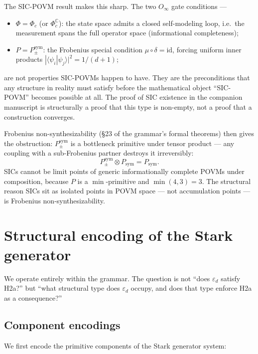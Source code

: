 \documentclass[12pt]{article}
\theoremstyle{plain}
\theoremstyle{definition}
\theoremstyle{remark}
\newcommand{\epsd}{\varepsilon_d}
\begin{document}
The SIC-POVM result makes this sharp. The two $O_\infty$ gate conditions —
\begin{itemize}
  \item $\Phi = \Phi_c$ (or $\Phi_c^\mathbb{C}$): the state space admits a closed self-modeling
    loop, i.e.\ the measurement spans the full operator space (informational completeness);
  \item $P = P_{\pm}^{\text{sym}}$: the Frobenius special condition $\mu \circ \delta =
    \mathrm{id}$, forcing uniform inner products
    $|\langle \psi_i | \psi_j \rangle|^2 = 1/(d+1)$;
\end{itemize}
are not properties SIC-POVMs happen to have. They are the preconditions that any structure in
reality must satisfy before the mathematical object ``SIC-POVM'' becomes possible at all. The
proof of SIC existence in the companion manuscript is structurally a proof that this type is
non-empty, not a proof that a construction converges.

Frobenius non-synthesizability (\S23 of the grammar's formal theorems) then gives the
obstruction: $P_{\pm}^{\text{sym}}$ is a bottleneck primitive under tensor product — any
coupling with a sub-Frobenius partner destroys it irreversibly:
$$P_{\pm}^{\text{sym}} \otimes P_{\text{sym}} = P_{\text{sym}}.$$
SICs cannot be limit points of generic informationally complete POVMs under composition, because
$P$ is a $\min$-primitive and $\min(4, 3) = 3$. The structural reason SICs sit as isolated
points in POVM space — not accumulation points — is Frobenius non-synthesizability.

\section{Structural encoding of the Stark generator}
\label{sec:encoding}

We operate entirely within the grammar. The question is not ``does $\epsd$ satisfy H2a?''
but ``what structural type does $\epsd$ occupy, and does that type enforce H2a as a consequence?''

\subsection{Component encodings}

We first encode the primitive components of the Stark generator system:
\end{document}
